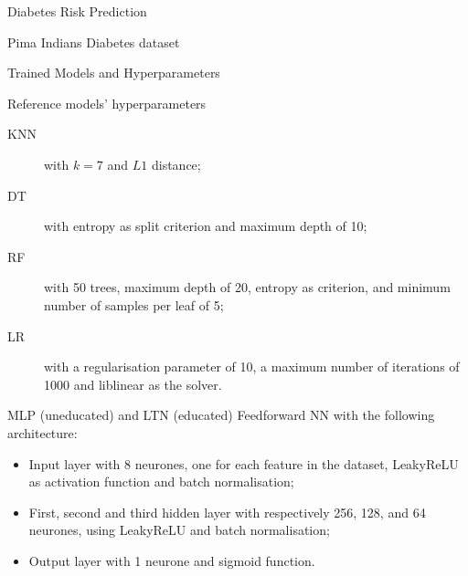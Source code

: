 \documentclass[presentation]{beamer} %
\begin{document}
{\begin{frame}{Diabetes Risk Prediction}
\begin{block}{Pima Indians Diabetes dataset}
\begin{table}[h]
\label{tab:pima}%
\end{table}
\end{block}

\end{frame}


\begin{frame}{Trained Models and Hyperparameters}

\begin{block}{Reference models' hyperparameters}
%
\begin{description}
  \item[KNN] with $k=7$ and $L1$ distance;
  \item[DT] with entropy as split criterion and maximum depth of 10;
  \item[RF] with 50 trees, maximum depth of 20, entropy as criterion, and minimum number of samples per leaf of 5;
  \item[LR] with a regularisation parameter of 10, a maximum number of iterations of 1000 and liblinear as the solver.
\end{description}
\end{block}


\begin{block}{MLP (uneducated) and LTN (educated)}
Feedforward NN with the following architecture:
%
\begin{itemize}
  \item Input layer with 8 neurones, one for each feature in the dataset, LeakyReLU as activation function and batch normalisation;
  \item First, second and third hidden layer with respectively 256, 128, and 64 neurones, using LeakyReLU and batch normalisation;
  \item Output layer with 1 neurone and sigmoid function.
\end{itemize}
\end{block}

\end{frame}


\begin{frame}


\end{frame}}
\end{document}
